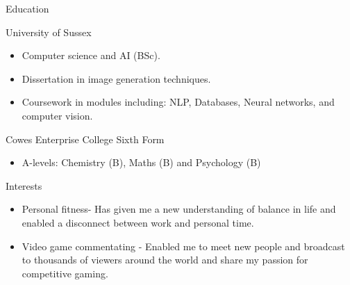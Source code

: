 \documentclass[a4paper]{article}
\newlength{\tabin}
\newlength{\secsep}
\newcommand{\lineunder}{\vspace*{-8pt} \\ \hspace*{-6pt} \hrulefill \\ \vspace*{-15pt}}
\newenvironment{tabbedsection}[1]{
  \begin{list}{}{
      \setlength{\itemsep}{0pt}
      \setlength{\labelsep}{0pt}
      \setlength{\labelwidth}{0pt}
      \setlength{\leftmargin}{\tabin}
      \setlength{\rightmargin}{\tabin}
      \setlength{\listparindent}{0pt}
      \setlength{\parsep}{0pt}
      \setlength{\parskip}{0pt}
      \setlength{\partopsep}{0pt}
      \setlength{\topsep}{#1}
    }
  \item[]
}{\end{list}}
\newenvironment{resume_section}[1]{
  \filbreak
  \vspace{2\secsep}
  \textsc{\large#1}
  \lineunder
  \begin{tabbedsection}{\secsep}
}{\end{tabbedsection}}
\newenvironment{resume_subsection}[2][]{
  \textbf{#2} \hfill {\footnotesize #1} \hspace{2em}
  \begin{tabbedsection}{0.5\secsep}
}{\end{tabbedsection}}
\newenvironment{subitems}{
  \renewcommand{\labelitemi}{-}
  \begin{itemize}
      \setlength{\labelsep}{1em}
}{\end{itemize}}
\begin{document}
\begin{resume_section}{Education}
  \begin{resume_subsection}[Brighton (2018-2022)]{University of Sussex}
    \begin{subitems}
      \item Computer science and AI (BSc).
      \item Dissertation in image generation techniques. 
      \item Coursework in modules including: NLP, Databases, Neural networks, and computer vision.
    \end{subitems}
  \end{resume_subsection}
  
  \begin{resume_subsection}{Cowes Enterprise College Sixth Form}
    \begin{subitems}
      \item A-levels: Chemistry (B), Maths (B) and Psychology (B)
     \end{subitems}
  \end{resume_subsection}
\end{resume_section}

\begin{resume_section}{Interests}
  \begin{subitems}
   \item Personal fitness- Has given me a new understanding of balance in life and enabled a disconnect between work and personal time.
   \item Video game commentating - Enabled me to meet new people and broadcast to thousands of viewers around the world and share my passion for competitive gaming. 
   \end{subitems}
\end{resume_section}
\end{document}
